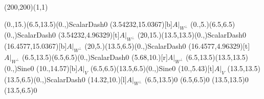 \unitlength=1bp%

\begin{feynartspicture}(200,200)(1,1)

\FADiagram{}
\FAProp(0.,15.)(6.5,13.5)(0.,){ScalarDash}{0}
\FALabel(3.54232,15.0367)[b]{$A|_{W^\perp}$}
\FAProp(0.,5.)(6.5,6.5)(0.,){ScalarDash}{0}
\FALabel(3.54232,4.96329)[t]{$A|_{W^\perp}$}
\FAProp(20,15.)(13.5,13.5)(0.,){ScalarDash}{0}
\FALabel(16.4577,15.0367)[b]{$A|_{W^\perp}$}
\FAProp(20,5.)(13.5,6.5)(0.,){ScalarDash}{0}
\FALabel(16.4577,4.96329)[t]{$A|_{W^\perp}$}
\FAProp(6.5,13.5)(6.5,6.5)(0.,){ScalarDash}{0}
\FALabel(5.68,10.)[r]{$A|_{W^\perp}$}
\FAProp(6.5,13.5)(13.5,13.5)(0.,){Sine}{0}
\FALabel(10.,14.57)[b]{$A|_V$}
\FAProp(6.5,6.5)(13.5,6.5)(0.,){Sine}{0}
\FALabel(10.,5.43)[t]{$A|_V$}
\FAProp(13.5,13.5)(13.5,6.5)(0.,){ScalarDash}{0}
\FALabel(14.32,10.)[l]{$A|_{W^\perp}$}
\FAVert(6.5,13.5){0}
\FAVert(6.5,6.5){0}
\FAVert(13.5,13.5){0}
\FAVert(13.5,6.5){0}
\end{feynartspicture}

